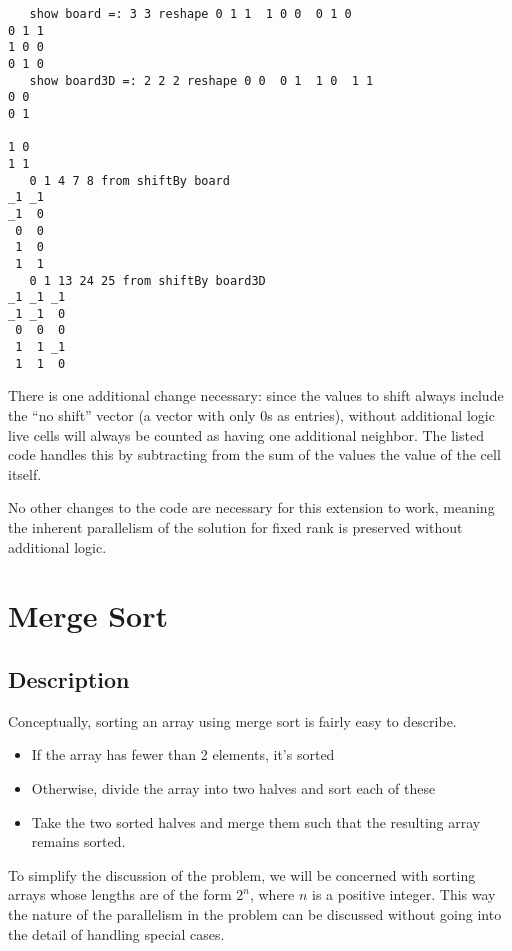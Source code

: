 \begin{singlespacing}
\begin{small}
\begin{verbatim}
   show board =: 3 3 reshape 0 1 1  1 0 0  0 1 0
0 1 1
1 0 0
0 1 0
   show board3D =: 2 2 2 reshape 0 0  0 1  1 0  1 1
0 0
0 1

1 0
1 1
   0 1 4 7 8 from shiftBy board
_1 _1
_1  0
 0  0
 1  0
 1  1
   0 1 13 24 25 from shiftBy board3D
_1 _1 _1
_1 _1  0
 0  0  0
 1  1 _1
 1  1  0
\end{verbatim}
\end{small}
\end{singlespacing}

There is one additional change necessary:
since the values to shift always include the ``no shift'' vector
(a vector with only 0s as entries),
without additional logic live cells will always be counted as 
having one additional neighbor. 
The listed code handles this by subtracting from 
the sum of the values the value of the cell itself.

No other changes to the code are necessary for this extension to work, 
meaning the inherent parallelism of the solution for fixed rank 
is preserved without additional logic.

\section{Merge Sort}
\label{mgdes}
\subsection{Description}
Conceptually, sorting an array using merge sort is fairly easy to describe.

\begin{itemize}
	\item If the array has fewer than 2 elements, it's sorted
	\item Otherwise, divide the array into two halves and sort each of these
	\item Take the two sorted halves and merge them such that the resulting array remains sorted.
\end{itemize}

To simplify the discussion of the problem, 
we will be concerned with sorting arrays 
whose lengths are of the form $2^n$, where $n$ is a positive integer.
This way the nature of the parallelism in the problem can be discussed 
without going into the detail of handling special cases.

